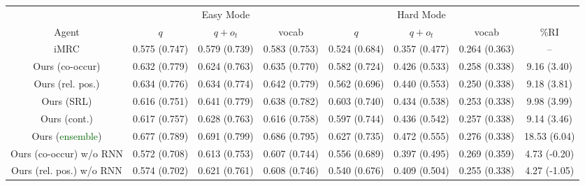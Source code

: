 \documentclass[11pt]{article}
\newcommand{\imrc}{iMRC\xspace}
\begin{document}
\begin{table*}%
    \centering
    \scriptsize
    \begin{tabular}{c|ccc|ccc|c}
        \toprule
        & \multicolumn{3}{c|}{Easy Mode} & \multicolumn{3}{c|}{Hard Mode} &  \\
        Agent & $q$ & $q + o_t$ & vocab & $q$ & $q + o_t$ & vocab & \%RI\\
        \midrule %
        \imrc \citep{yuan2020imrc}      &  0.575 \color{blue}(0.747) & 0.579 \color{blue}(0.739) & 0.583 \color{blue}(0.753) & 0.524 \color{blue}(0.684) & 0.357 \color{blue}(0.477) & 0.264 \color{blue}(0.363) & -- \\
        \midrule
        Ours (co-occur)                         & 0.632 \color{blue}(0.779) & 0.624 \color{blue}(0.763) & 0.635 \color{blue}(0.770) & 0.582 \color{blue}(0.724) & 0.426 \color{blue}(0.533) & 0.258 \color{blue}(0.338) & 9.16 \color{blue}(3.40) \\
        Ours (rel. pos.)                        & 0.634 \color{blue}(0.776) & 0.634 \color{blue}(0.774) & 0.642 \color{blue}(0.779) & 0.562 \color{blue}(0.696) & 0.440 \color{blue}(0.553) & 0.250 \color{blue}(0.338) & 9.18 \color{blue}(3.81) \\
        Ours (SRL)                              & 0.616 \color{blue}(0.751) & 0.641 \color{blue}(0.779) & 0.638 \color{blue}(0.782) & 0.603 \color{blue}(0.740) & 0.434 \color{blue}(0.538) & 0.253 \color{blue}(0.338) & 9.98 \color{blue}(3.99) \\
        Ours (cont.)                            & 0.617 \color{blue}(0.757) & 0.628 \color{blue}(0.763) & 0.616 \color{blue}(0.758) & 0.597 \color{blue}(0.744) & 0.436 \color{blue}(0.542) & 0.257 \color{blue}(0.338) & 9.14 \color{blue}(3.46) \\
        Ours (\textcolor{darkgreen}{ensemble})  & 0.677 \color{blue}(0.789) & 0.691 \color{blue}(0.799) & 0.686 \color{blue}(0.795) & 0.627 \color{blue}(0.735) & 0.472 \color{blue}(0.555) & 0.276 \color{blue}(0.338) & 18.53 \color{blue}(6.04) \\
        \midrule
        Ours (co-occur) w/o RNN                         & 0.572 \color{blue}(0.708) & 0.613 \color{blue}(0.753) & 0.607 \color{blue}(0.744) & 0.556 \color{blue}(0.689) & 0.397 \color{blue}(0.495) & 0.269 \color{blue}(0.359) & 4.73 \color{blue}(-0.20) \\
        Ours (rel. pos.) w/o RNN                        & 0.574 \color{blue}(0.702) & 0.621 \color{blue}(0.761) & 0.608 \color{blue}(0.746) & 0.540 \color{blue}(0.676) & 0.409 \color{blue}(0.504) & 0.255 \color{blue}(0.338) & 4.27 \color{blue}(-1.05) \\

\end{tabular}
\end{table*}
\end{document}
